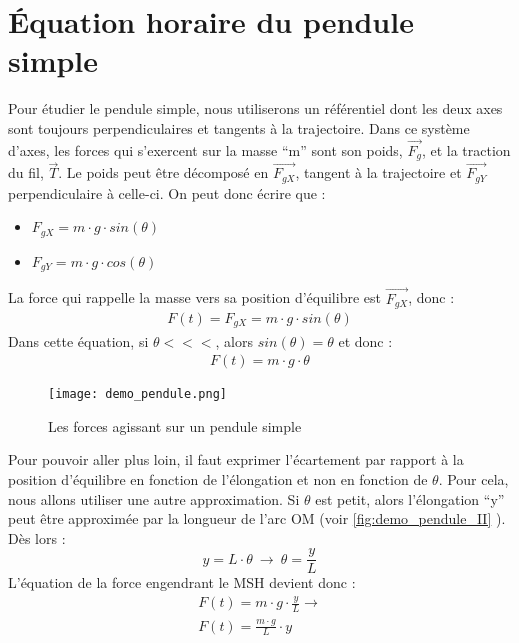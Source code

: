 \section{Équation horaire du pendule simple}
Pour étudier le pendule simple, nous utiliserons un référentiel dont les deux axes sont toujours perpendiculaires et tangents à la trajectoire.
Dans ce système d'axes, les forces qui s'exercent sur la masse \enquote{m} sont son poids, \(\vec{F_g}\), et la traction du fil, \(\vec{T}\). Le poids peut être décomposé en \(\vec{F_{gX}}\), tangent à la trajectoire et \(\vec{F_{gY}}\) perpendiculaire à celle-ci.
On peut donc écrire que :
\begin{itemize}
    \item \(F_{gX}=m \cdot g  \cdot sin(\theta)\)
    \item \(F_{gY}=m \cdot g  \cdot cos(\theta)\)
\end{itemize}



La force qui rappelle la masse vers sa position d'équilibre est \(\vec{F_{gX}}\), donc :
\begin{align}
    F(t)=F_{gX}=m \cdot g \cdot sin(\theta)
\end{align}
Dans cette équation, si \(\theta <<<\), alors \(sin(\theta)=\theta\) et donc :
\begin{align}
    F(t)=m \cdot g \cdot \theta
\end{align}


\begin{figure}[h!]
    \centering
    \texttt{[image: demo\_pendule.png]}
    \caption{Les forces agissant sur un pendule simple}
    \label{demo_pendule_I}
\end{figure}

\newpage

Pour pouvoir aller plus loin, il faut exprimer l'écartement par rapport à la position d'équilibre en fonction de l'élongation et non en fonction de \(\theta\).
Pour cela, nous allons utiliser une autre approximation.
Si \(\theta\) est petit, alors l'élongation \enquote{y} peut être approximée par la longueur de l'arc OM (voir \cref{fig:demo_pendule_II} ).
Dès lors :
\begin{equation}
    y=L \cdot \theta \ \rightarrow \ \theta=\frac{y}{L}
\end{equation}
L'équation de la force engendrant le MSH devient donc :
\begin{align}
    F(t)=m \cdot g \cdot \frac{y}{L} \rightarrow \\
    F(t)=\frac{m \cdot g}{L} \cdot y
\end{align}

